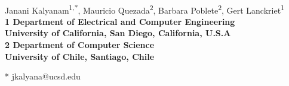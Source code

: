 \documentclass[10pt,letterpaper]{article}
\date{}
\begin{document}
\vspace*{0.35in}

\begin{flushleft}
{\Large
\textbf{}
}
\newline
\\
Janani Kalyanam\textsuperscript{1,*},
Mauricio Quezada\textsuperscript{2},
Barbara Poblete\textsuperscript{2},
Gert Lanckriet\textsuperscript{1}
\\
\bigskip
\bf{1} Department of Electrical and Computer Engineering \\ University of California, San Diego, California, U.S.A
\\
\bf{2} Department of Computer Science \\ University of Chile, Santiago, Chile
\\
\bigskip

% 
%





* jkalyana@ucsd.edu

\end{flushleft}
\end{document}
